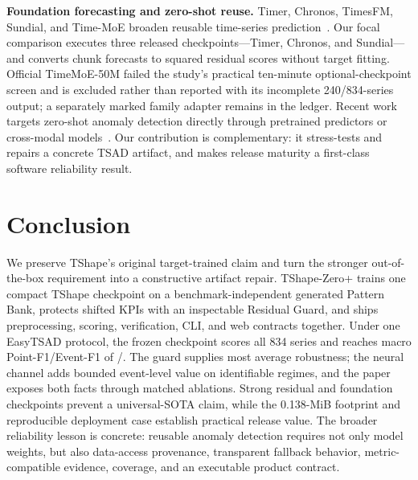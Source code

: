 \documentclass[conference]{IEEEtran}
\newcommand{\method}{TShape-Zero+}
\newcommand{\pfone}{Point-F1}
\newcommand{\efone}{Event-F1}
\begin{document}
\textbf{Foundation forecasting and zero-shot reuse.}
Timer, Chronos, TimesFM, Sundial, and Time-MoE broaden reusable time-series prediction~\cite{liu2024timer,ansari2024chronos,das2024timesfm,liu2025sundial,shi2024timemoe}. Our focal comparison executes three released checkpoints---Timer, Chronos, and Sundial---and converts chunk forecasts to squared residual scores without target fitting. Official TimeMoE-50M failed the study's practical ten-minute optional-checkpoint screen and is excluded rather than reported with its incomplete 240/834-series output; a separately marked family adapter remains in the ledger. Recent work targets zero-shot anomaly detection directly through pretrained predictors or cross-modal models~\cite{lan2025timercd,yang2026vetime}. Our contribution is complementary: it stress-tests and repairs a concrete TSAD artifact, and makes release maturity a first-class software reliability result.





\section{Conclusion}

We preserve TShape's original target-trained claim and turn the stronger out-of-the-box requirement into a constructive artifact repair. \method{} trains one compact TShape checkpoint on a benchmark-independent generated Pattern Bank, protects shifted KPIs with an inspectable Residual Guard, and ships preprocessing, scoring, verification, CLI, and web contracts together. Under one EasyTSAD protocol, the frozen checkpoint scores all 834 series and reaches macro \pfone{}/\efone{} of \FinalMacroPoint{}/\FinalMacroEvent{}. The guard supplies most average robustness; the neural channel adds bounded event-level value on identifiable regimes, and the paper exposes both facts through matched ablations. Strong residual and foundation checkpoints prevent a universal-SOTA claim, while the 0.138-MiB footprint and reproducible deployment case establish practical release value. The broader reliability lesson is concrete: reusable anomaly detection requires not only model weights, but also data-access provenance, transparent fallback behavior, metric-compatible evidence, coverage, and an executable product contract.

\clearpage


\end{document}

